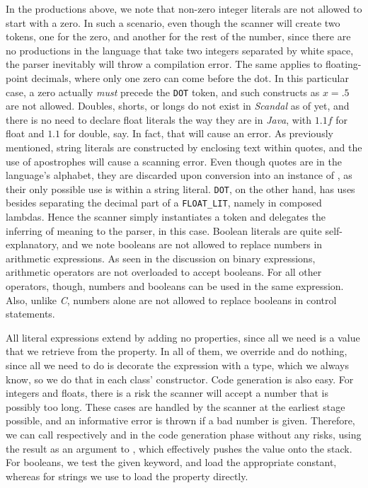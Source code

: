 In the productions above, we note that non-zero integer literals are not allowed to start with a zero. In such a scenario, even though the scanner will create two tokens, one for the zero, and another for the rest of the number, since there are no productions in the language that take two integers separated by white space, the parser inevitably will throw a compilation error. The same applies to floating-point decimals, where only one zero can come before the dot. In this particular case, a zero actually \emph{must} precede the \texttt{DOT} token, and such constructs as $x = .5$ are not allowed. Doubles, shorts, or longs do not exist in \emph{Scandal} as of yet, and there is no need to declare float literals the way they are in \emph{Java}, with $1.1f$ for float and $1.1$ for double, say. In fact, that will cause an error. As previously mentioned, string literals are constructed by enclosing text within quotes, and the use of apostrophes will cause a scanning error. Even though quotes are in the language's alphabet, they are discarded upon conversion into an instance of , as their only possible use is within a string literal. \texttt{DOT}, on the other hand, has uses besides separating the decimal part of a \texttt{FLOAT\_LIT}, namely in composed lambdas. Hence the scanner simply instantiates a token and delegates the inferring of meaning to the parser, in this case. Boolean literals are quite self-explanatory, and we note booleans are not allowed to replace numbers in arithmetic expressions. As seen in the discussion on binary expressions, arithmetic operators are not overloaded to accept booleans. For all other operators, though, numbers and booleans can be used in the same expression. Also, unlike \emph{C}, numbers alone are not allowed to replace booleans in control statements.

All literal expressions extend  by adding no properties, since all we need is a value that we retrieve from the  property. In all of them, we override  and do nothing, since all we need to do is decorate the expression with a type, which we always know, so we do that in each class' constructor. Code generation is also easy. For integers and floats, there is a risk the scanner will accept a number that is possibly too long. These cases are handled by the scanner at the earliest stage possible, and an informative error is thrown if a bad number is given. Therefore, we can call respectively  and  in the code generation phase without any risks, using the result as an argument to , which effectively pushes the value onto the stack. For booleans, we test the given keyword, and load the appropriate constant, whereas for strings we use  to load the  property directly.

